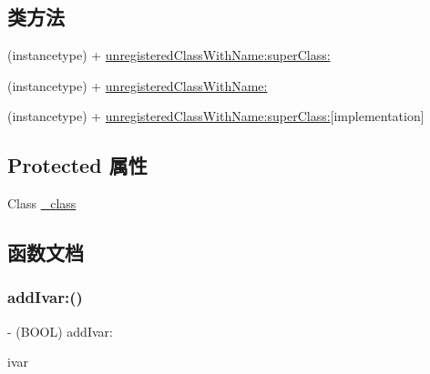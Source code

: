 \subsection*{类方法}
\begin{DoxyCompactItemize}
\item 
(instancetype) + \hyperlink{interface_m_a_r_unregistered_class_a0898225c7a71867416a0b8b2f1d98007}{unregistered\+Class\+With\+Name\+:super\+Class\+:}
\item 
(instancetype) + \hyperlink{interface_m_a_r_unregistered_class_aeac9876ee6f665656a32c8aec95690ed}{unregistered\+Class\+With\+Name\+:}
\item 
(instancetype) + \hyperlink{interface_m_a_r_unregistered_class_a4205f2f4be843ea61c318ede9d77e49c}{unregistered\+Class\+With\+Name\+:super\+Class\+:}{\ttfamily  \mbox{[}implementation\mbox{]}}
\end{DoxyCompactItemize}
\subsection*{Protected 属性}
\begin{DoxyCompactItemize}
\item 
Class \hyperlink{interface_m_a_r_unregistered_class_ae5619e1545994e8d035de4baec5fa711}{\+\_\+class}
\end{DoxyCompactItemize}


\subsection{函数文档}
\mbox{\label{interface_m_a_r_unregistered_class_aabe94edfff3f8a4701bcdb0867506321}} 
\subsubsection{\texorpdfstring{add\+Ivar\+:()}{addIvar:()}}
{\footnotesize\ttfamily -\/ (B\+O\+OL) add\+Ivar\+: \begin{DoxyParamCaption}\item[{(\hyperlink{interface_m_a_r_ivar}{M\+A\+R\+Ivar} $\ast$)}]{ivar }\end{DoxyParamCaption}}

\mbox{\label{interface_m_a_r_unregistered_class_aa1fa89502ef87defac0e218b232d49d3}} 
